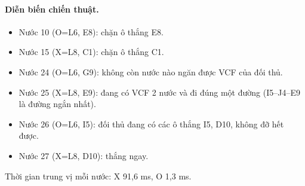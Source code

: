 \paragraph{Diễn biến chiến thuật.}
\begin{itemize}\small
\setlength{\itemsep}{0pt}
  \item Nước 10 (O=L6, E8): chặn ô thắng E8.
  \item Nước 15 (X=L8, C1): chặn ô thắng C1.
  \item Nước 24 (O=L6, G9): không còn nước nào ngăn được VCF của đối thủ.
  \item Nước 25 (X=L8, E9): đang có VCF 2 nước và đi đúng một đường (I5--J4--E9 là đường ngắn nhất).
  \item Nước 26 (O=L6, I5): đối thủ đang có các ô thắng I5, D10, không đỡ hết được.
  \item Nước 27 (X=L8, D10): thắng ngay.
\end{itemize}
Thời gian trung vị mỗi nước: X 91,6 ms, O 1,3 ms.
\clearpage

